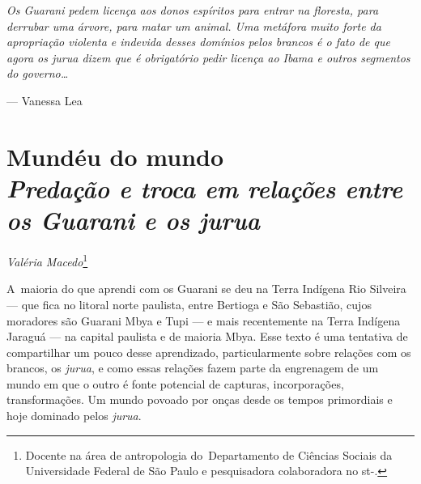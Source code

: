 \clearpage

\vspace*{\fill}

\begin{flushright}
\begin{minipage}[c]{0.85\textwidth}
\raggedleft
\footnotesize
\emph{Os Guarani pedem licença aos donos espíritos para entrar na floresta,
para derrubar uma árvore, para matar um animal. Uma metáfora muito
forte da apropriação violenta e indevida desses domínios pelos brancos é o fato de
que agora os jurua dizem que é obrigatório pedir licença ao Ibama e
outros segmentos do governo\ldots{}}

\smallskip
\hspace*{\fill}--- Vanessa Lea
\end{minipage}
\end{flushright}

\thispagestyle{empty}

\chapter*{Mundéu do mundo\\ 
\large{\emph{Predação e troca em relações entre os Guarani e os \emph{jurua}}}}


\begin{flushright}
\emph{Valéria Macedo}\footnote{Docente na área de antropologia
do~Departamento de Ciências Sociais da Universidade Federal de São
Paulo e pesquisadora colaboradora no st-.}
\end{flushright}
\medskip

\noindent A~maioria do que aprendi com os Guarani se deu na Terra Indígena Rio
Silveira --- que fica no litoral norte paulista, entre Bertioga e São
Sebastião, cujos moradores são Guarani Mbya e Tupi --- e mais
recentemente na Terra Indígena Jaraguá --- na capital paulista e de
maioria Mbya. Esse texto é uma tentativa de compartilhar um pouco desse
aprendizado, particularmente sobre relações com os brancos, os \emph{jurua}, e
como essas relações fazem parte da engrenagem de um mundo em que o
outro é fonte potencial de capturas, incorporações, transformações. Um
mundo povoado por onças desde os tempos primordiais e hoje dominado
pelos \emph{jurua}. 

